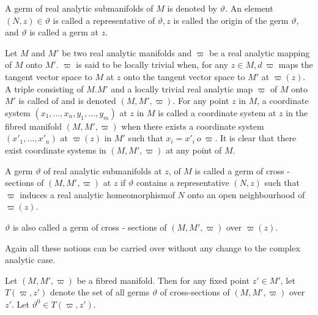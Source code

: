 A germ of real analytic submanifolds of $M$ is denoted by
$\vartheta$. An element $(N, z) \in \vartheta$ is called a
representative of $\vartheta,  z$  is called the origin of the germ
$\vartheta$,  and $\vartheta$ is called a germ at $z$. 

Let $M$ and $M'$ be two real analytic manifolds and $\varpi$ be a real
analytic mapping of $M$ onto $M'$. $\varpi$ is said to be locally
trivial when,  for any $z \in M,  d ~ \varpi$ maps the tangent vector
space to $M$ at $z$ onto the tangent vector space to $M'$ at
$\varpi(z)$. A triple consisting of $M.M'$ and a locally trivial real
analytic map $\varpi$ of $M$ onto $M'$ is called of  and is denoted $(M,  M',  \varpi)$. For any point $z$ in
$M$,  a coordinate system $(x_1,  \ldots,  x_n,  y_1,  \ldots,  y_m)$
at $z$ in $M$ is called a coordinate system at $z$ in the fibred
manifold $(M,  M',  \varpi)$ when there exists a coordinate system
$(x'_1,  \ldots,  x'_n)$ at $\varpi(z)$ in $M'$ such that $x_i = x'_i
~ o ~ \varpi$. It is clear that there exist coordinate systems in $(M,
M',  \varpi)$ at any point of $M$. 

\begin{defi*}%
  A germ $\vartheta$ of real analytic submanifolds at $z$,  of $M$ is
  called a germ of cross - sections of $(M,  M',  \varpi)$ at
  $z$ if $\vartheta$ contains a representative $(N, z)$ such that
  $\varpi$ induces a real analytic homeomorphism\pageoriginale of $N$ onto an open
  neighbourhood of $\varpi(z)$. 
\end{defi*}

$\vartheta$ is also called a germ of cross - sections of $(M,  M',
\varpi)$ over $\varpi(z)$. 

Again all these notions can be carried over without any change to the
complex analytic case. 

Let $(M,  M',  \varpi)$ be a fibred manifold. Then for any fixed point
$z' \in M'$,  let $T(\varpi,  z')$ denote the set of all germs
$\vartheta$ of cross-sections of \break $(M,  M',  \varpi)$ over $z'$. Let
$\vartheta^0 \in T (\varpi,  z')$. 

